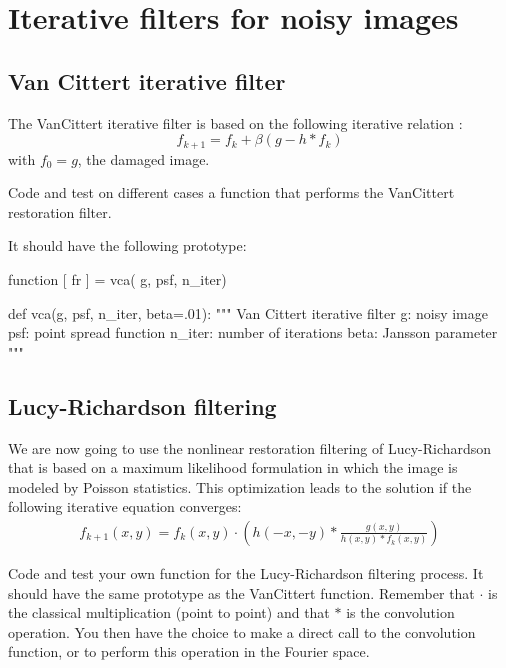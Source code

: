 \section{Iterative filters for noisy images}

\subsection{Van Cittert iterative filter}
The VanCittert iterative filter is based on the following iterative relation :
$$f_{k+1}=f_k+\beta(g-h*f_k)$$
with $f_0=g$, the damaged image.

\begin{qbox}
Code and test on different cases a function that performs the VanCittert restoration filter.  
\end{qbox}

It should have the following prototype:
\begin{matlab}
function [ fr ] = vca( g, psf, n_iter)
%
\end{matlab}

\begin{python}
def vca(g, psf, n_iter, beta=.01):
    """
    Van Cittert iterative filter
    g: noisy image
    psf: point spread function
    n_iter: number of iterations
    beta: Jansson parameter
    """
\end{python}


\subsection{Lucy-Richardson filtering}
We are now going to use the nonlinear restoration filtering of Lucy-Richard\-son that is based on a maximum likelihood formulation in which the image is modeled by Poisson statistics. This optimization leads to the solution if the following iterative equation converges:
\begin{eqnarray}
{f}_{k+1}(x,y)={f}_{k}(x,y)\cdot \left(h(-x,-y)*\frac{g(x,y)}{h(x,y)*{f}_k(x,y)}\right)
\end{eqnarray}

\begin{qbox}
Code and test your own function for the Lucy-Richardson filtering process. It should have the same prototype as the VanCittert function. Remember that $\cdot$ is the classical multiplication (point to point) and that $*$ is the convolution operation. You then have the choice to make a direct call to the convolution function, or to perform this operation in the Fourier space.
\end{qbox}


